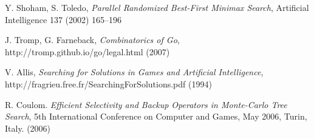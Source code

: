 \documentclass[conference]{IEEEtran}
\begin{document}
\begin{thebibliography}{1}

Y. Shoham, S. Toledo, \emph{Parallel Randomized Best-First Minimax Search},  Artificial Intelligence 137 (2002) 165--196

J. Tromp, G. Farneback, \emph{Combinatorics of Go},
http://tromp.github.io/go/legal.html (2007)

V. Allis, \emph{Searching for Solutions in Games and Artificial Intelligence},
http://fragrieu.free.fr/SearchingForSolutions.pdf (1994)

R. Coulom.  \emph{Efficient Selectivity and Backup Operators in Monte-Carlo Tree Search}, 5th International Conference on Computer and Games, May 2006, Turin, Italy. (2006)

\end{thebibliography}
\end{document}
